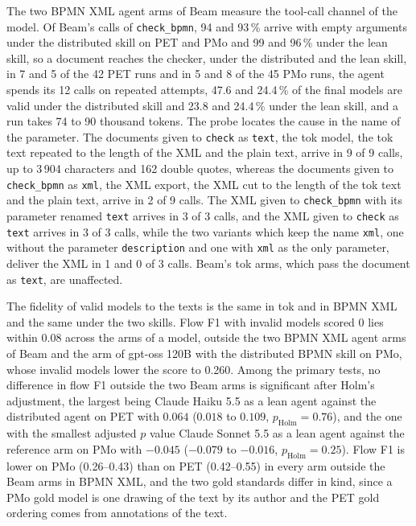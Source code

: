 \documentclass[11pt,a4paper]{article}
\begin{document}
The two BPMN XML agent arms of Beam measure the tool-call channel of the model. Of Beam's calls of \texttt{check\_bpmn}, 94 and 93\,\% arrive with empty arguments under the distributed skill on PET and PMo and 99 and 96\,\% under the lean skill, so a document reaches the checker, under the distributed and the lean skill, in 7 and 5 of the 42 PET runs and in 5 and 8 of the 45 PMo runs, the agent spends its 12 calls on repeated attempts, 47.6 and 24.4\,\% of the final models are valid under the distributed skill and 23.8 and 24.4\,\% under the lean skill, and a run takes 74 to 90 thousand tokens. The probe locates the cause in the name of the parameter. The documents given to \texttt{check} as \texttt{text}, the tok model, the tok text repeated to the length of the XML and the plain text, arrive in 9 of 9 calls, up to 3\,904 characters and 162 double quotes, whereas the documents given to \texttt{check\_bpmn} as \texttt{xml}, the XML export, the XML cut to the length of the tok text and the plain text, arrive in 2 of 9 calls. The XML given to \texttt{check\_bpmn} with its parameter renamed \texttt{text} arrives in 3 of 3 calls, and the XML given to \texttt{check} as \texttt{text} arrives in 3 of 3 calls, while the two variants which keep the name \texttt{xml}, one without the parameter \texttt{description} and one with \texttt{xml} as the only parameter, deliver the XML in 1 and 0 of 3 calls. Beam's tok arms, which pass the document as \texttt{text}, are unaffected.

The fidelity of valid models to the texts is the same in tok and in BPMN XML and the same under the two skills. Flow F1 with invalid models scored 0 lies within 0.08 across the arms of a model, outside the two BPMN XML agent arms of Beam and the arm of gpt-oss 120B with the distributed BPMN skill on PMo, whose invalid models lower the score to 0.260. Among the primary tests, no difference in flow F1 outside the two Beam arms is significant after Holm's adjustment, the largest being Claude Haiku 5.5 as a lean agent against the distributed agent on PET with $0.064$ ($0.018$ to $0.109$, $p_\text{Holm}=0.76$), and the one with the smallest adjusted $p$ value Claude Sonnet 5.5 as a lean agent against the reference arm on PMo with $-0.045$ ($-0.079$ to $-0.016$, $p_\text{Holm}=0.25$). Flow F1 is lower on PMo (0.26--0.43) than on PET (0.42--0.55) in every arm outside the Beam arms in BPMN XML, and the two gold standards differ in kind, since a PMo gold model is one drawing of the text by its author and the PET gold ordering comes from annotations of the text.
\end{document}
